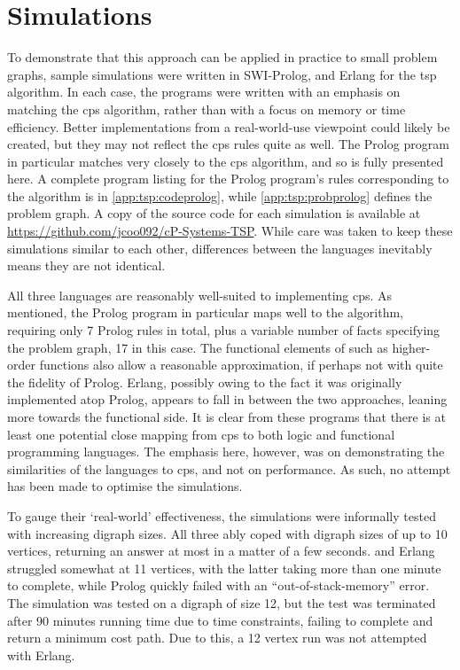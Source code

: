 \section{\label{sec:tsp:simulation}Simulations}
To demonstrate that this approach can be applied in practice to small problem graphs, sample simulations were written in SWI-Prolog, \fsharp{} and Erlang for the \gls{tsp} algorithm.  In each case, the programs were written with an emphasis on matching the \gls{cps} algorithm, rather than with a focus on memory or time efficiency.  Better implementations from a real-world-use viewpoint could likely be created, but they may not reflect the \gls{cps} rules quite as well.  The Prolog program in particular matches very closely to the \gls{cps} algorithm, and so is fully presented here.  A complete program listing for the Prolog program's rules corresponding to the algorithm is in \cref{app:tsp:codeprolog}, while \cref{app:tsp:probprolog} defines the problem graph.  A copy of the source code for each simulation is available at \url{https://github.com/jcoo092/cP-Systems-TSP}.  While care was taken to keep these simulations similar to each other, differences between the languages inevitably means they are not identical.

All three languages are reasonably well-suited to implementing \gls{cps}.  As mentioned, the Prolog program in particular maps well to the algorithm, requiring only 7 Prolog rules in total, plus a variable number of facts specifying the problem graph, 17 in this case.  The functional elements of \fsharp{} such as higher-order functions also allow a reasonable approximation, if perhaps not with quite the fidelity of Prolog.  Erlang, possibly owing to the fact it was originally implemented atop Prolog, appears to fall in between the two approaches, leaning more towards the functional side.  It is clear from these programs that there is at least one potential close mapping from \gls{cps} to both logic and functional programming languages.  The emphasis here, however, was on demonstrating the similarities of the languages to \gls{cps}, and not on performance.  As such, no attempt has been made to optimise the simulations.

To gauge their `real-world' effectiveness, the simulations were informally tested with increasing digraph sizes.  All three ably coped with digraph sizes of up to 10 vertices, returning an answer at most in a matter of a few seconds.  \fsharp{} and Erlang struggled somewhat at 11 vertices, with the latter taking more than one minute to complete, while Prolog quickly failed with an ``out-of-stack-memory'' error.  The \fsharp{} simulation was tested on a digraph of size 12, but the test was terminated after 90 minutes running time due to time constraints, failing to complete and return a minimum cost path.  Due to this, a 12 vertex run was not attempted with Erlang.


